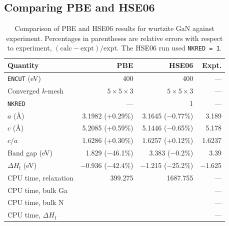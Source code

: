 \documentclass[../main.tex]{subfiles}
\begin{document}
\subsection{Comparing PBE and HSE06}


\begin{table}[htbp]
  \centering
  \small %
  \caption{Comparison of PBE and HSE06 results for wurtzite GaN against experiment.
  Percentages in parentheses are relative errors with respect to experiment,
  $(\text{calc}-\text{expt})/\text{expt}$. The HSE06 run used \texttt{NKRED = 1}.}
  \label{tab:pbe_vs_hse06_gan}
  \begin{tabular}{l rrr}
    \toprule
    Quantity & PBE & HSE06 & Expt. \\
    \midrule
    \texttt{ENCUT} (eV)        & 400 & 400 & --- \\
    Converged $k$-mesh         & $5\times5\times3$ & $5\times5\times3$ & --- \\
    \texttt{NKRED}             & --- & 1 & --- \\
    \midrule
    $a$ (\AA)                  & 3.1982 (+0.29\%) & 3.1645 ($-$0.77\%) & 3.189 \\
    $c$ (\AA)                  & 5.2085 (+0.59\%) & 5.1446 ($-$0.65\%) & 5.178 \\
    $c/a$                      & 1.6286 (+0.30\%) & 1.6257 (+0.12\%)   & 1.6237 \\
    Band gap (eV)              & 1.829 ($-$46.1\%) & 3.383 ($-$0.2\%)  & 3.39 \\
    $\Delta H_\mathrm{f}$ (eV) & $-$0.936 ($-$42.4\%) & $-$1.215 ($-$25.2\%) & $-$1.625 \\
    \midrule
    CPU time, relaxation       & 399.275 & 1687.755 & --- \\
    CPU time, bulk Ga          &  &  & --- \\ %
    CPU time, bulk N           &  &  & --- \\ %
    CPU time, $\Delta H_\mathrm{f}$ &  &  & --- \\ %
    \bottomrule
  \end{tabular}
\end{table}
\end{document}
